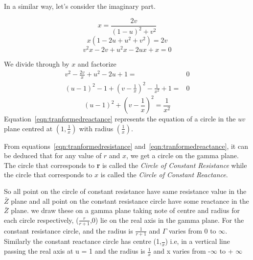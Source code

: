 In a similar way, let's consider the imaginary part.

\begin{equation*}
x = \frac{2v}{{(1 - u)}^2 + v^2}
\end{equation*}
\begin{equation*}
x(1 - 2u + u^2 + v^2) = 2v
\end{equation*}
\begin{equation*}
v^2x - 2v + u^2x - 2ux + x = 0
\end{equation*}


We divide through by $x$ and factorize
\begin{align*}
v^2 - \frac{2v}{x} +u^2 - 2u + 1 =& 0\\
{(u - 1)}^2 -1 + {\left(v - \frac{1}{x}\right)}^2 -\frac{1}{x^2} + 1 =& 0
\end{align*}
\begin{equation}
{(u - 1)}^2 + {\left(v - \frac{1}{x}\right)}^2 = \frac{1}{x^2}\label{eqn:tranformedreactance}
\end{equation}
Equation~\eqref{eqn:tranformedreactance} represents the equation of a circle in the $uv$ plane centred at $\left(1,\frac{1}{x}\right)$ with radius $\left(\frac{1}{x}\right)$.

From equations~\eqref{eqn:tranformedresistance} and~\eqref{eqn:tranformedreactance}, it can be deduced that for any value of $r$ and $x$, we get a circle on the gamma plane. The circle that corresponds to \textbf{r} is called the \emph{Circle of Constant Resistance} while the circle that corresponds to $x$ is called the \emph{Circle of Constant Reactance}.

So all point on the circle of constant resistance have same resistance value in the $\bar{Z}$ plane and all point on the constant resistance circle have some reactance in the $\bar{Z}$ plane. we draw these on a gamma plane taking note of centre and radius for each circle respectively, ($\frac{r}{r + 1}$,0) lie on the real axis in the gamma plane. For the constant resistance circle, and the radius is $\frac{1}{r + 1}$ and $\Gamma$ varies from 0 to $\infty$. Similarly the constant reactance circle has centre (1,$\frac{}{x}$) i.e, in a vertical line passing the real axis at u = 1 and the radius is $\frac{1}{x}$ and x varies from -$\infty$ to + $\infty$

